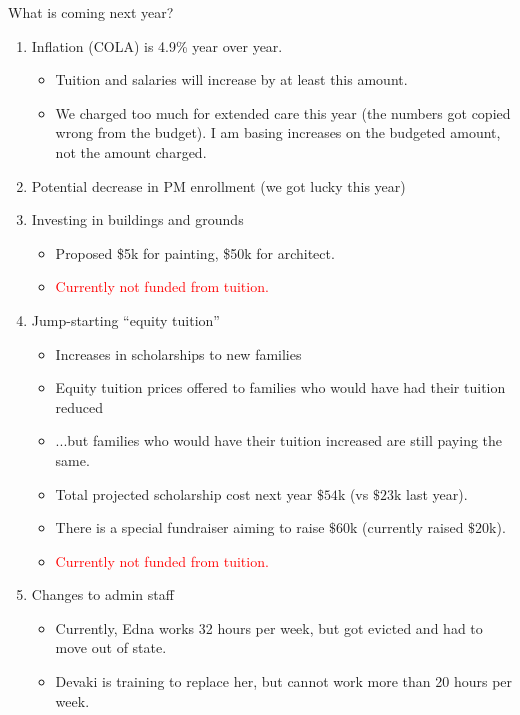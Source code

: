 \documentclass[8pt]{beamer}
\begin{document}
\begin{frame}{What is coming next year?}

%
\begin{enumerate}
%
\item Inflation (COLA) is 4.9\% year over year.
%
    \begin{itemize}
    \item Tuition and salaries will increase by at least this amount.
    \item We charged too much for extended care this year
    (the numbers got copied wrong from the budget).  I am basing increases
    on the budgeted amount, not the amount charged.
    \end{itemize}
%
\pause
\item Potential decrease in PM enrollment (we got lucky this year)
\pause
\item Investing in buildings and grounds
%
    \begin{itemize}
    \item Proposed \$5k for painting, \$50k for architect.
    \item \textcolor{red}{Currently not funded from tuition.}
    \end{itemize}
%
\pause
\item Jump-starting ``equity tuition''
    \begin{itemize}
    \item Increases in scholarships to new families
    \item Equity tuition prices offered to families who would have had their
    tuition reduced
    \item ...but families who would have their tuition increased are still paying
    the same.
    \item Total projected scholarship cost next year $\$54$k (vs $\$23$k last year).
    \item There is a special fundraiser aiming to raise $\$60$k (currently
    raised $\$20$k).
    \item \textcolor{red}{Currently not funded from tuition.}
    \end{itemize}
%
\item Changes to admin staff
\pause
    \begin{itemize}
        \item Currently, Edna works 32 hours per week, but got evicted and had to move out of state.
        \item Devaki is training to replace her, but cannot work more than 20 hours per week.

\end{itemize}
\end{enumerate}
\end{frame}
\end{document}

